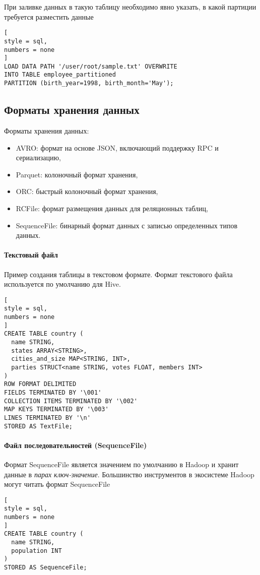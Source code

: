 \documentclass[%
	11pt,
	a4paper,
	utf8,
		]{article}
\begin{document}
При заливке данных в такую таблицу необходимо явно указать, в какой партиции требуется разместить данные
\begin{lstlisting}[
style = sql,
numbers = none	
]
LOAD DATA PATH '/user/root/sample.txt' OVERWRITE
INTO TABLE employee_partitioned
PARTITION (birth_year=1998, birth_month='May');
\end{lstlisting}

\subsection{Форматы хранения данных}

Форматы хранения данных:
\begin{itemize}
	\item AVRO: формат на основе JSON, включающий поддержку RPC и сериализацию,
	
	\item Parquet: колоночный формат хранения,
	
	\item ORC: быстрый колоночный формат хранения,
	
	\item RCFile: формат размещения данных для реляционных таблиц,
	
	\item SequenceFile: бинарный формат данных с записью определенных типов данных.
\end{itemize}

\paragraph{Текстовый файл} Пример создания таблицы в текстовом формате. Формат текстового файла используется по умолчанию для Hive. 

\begin{lstlisting}[
style = sql,
numbers = none	
]
CREATE TABLE country (
  name STRING,
  states ARRAY<STRING>,
  cities_and_size MAP<STRING, INT>,
  parties STRUCT<name STRING, votes FLOAT, members INT>
)
ROW FORMAT DELIMITED
FIELDS TERMINATED BY '\001'
COLLECTION ITEMS TERMINATED BY '\002'
MAP KEYS TERMINATED BY '\003'
LINES TERMINATED BY '\n'
STORED AS TextFile;
\end{lstlisting}

\paragraph{Файл последовательностей (SequenceFile)} Формат SequenceFile является значением по умолчанию в Hadoop и хранит данные в \emph{парах ключ-значение}. Большинство инструментов в экосистеме Hadoop могут читать формат SequenceFile
\begin{lstlisting}[
style = sql,
numbers = none	
]
CREATE TABLE country (
  name STRING,
  population INT
)
STORED AS SequenceFile;
\end{lstlisting}
\end{document}
